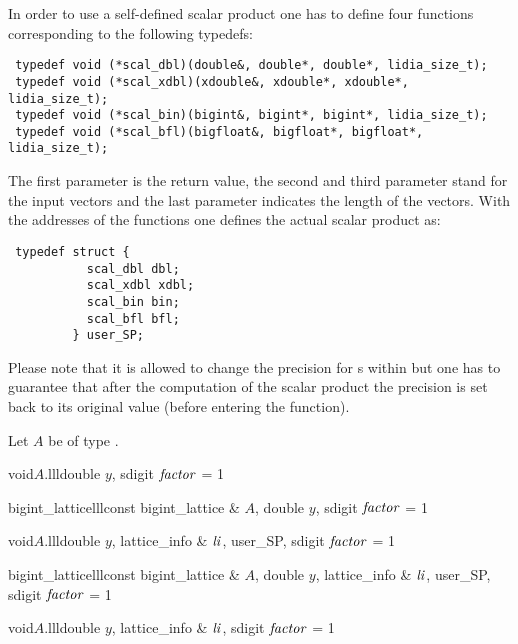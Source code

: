 In order to use a self-defined scalar product one has to define four functions corresponding to
the following typedefs:

\begin{verbatim}
 typedef void (*scal_dbl)(double&, double*, double*, lidia_size_t);
 typedef void (*scal_xdbl)(xdouble&, xdouble*, xdouble*, lidia_size_t);
 typedef void (*scal_bin)(bigint&, bigint*, bigint*, lidia_size_t);
 typedef void (*scal_bfl)(bigfloat&, bigfloat*, bigfloat*, lidia_size_t);
\end{verbatim}

The first parameter is the return value, the second and third parameter stand for the input
vectors and the last parameter indicates the length of the vectors.  With the addresses of the
functions one defines the actual scalar product as:
\begin{verbatim}
 typedef struct {
           scal_dbl dbl;
           scal_xdbl xdbl;
           scal_bin bin;
           scal_bfl bfl;
         } user_SP;
\end{verbatim}
Please note that it is allowed to change the precision for s within  but one has to guarantee that
after the computation of the scalar product the precision is set back to its original value
(before entering the function).

Let $A$ be of type .

\begin{fcode}{void}{$A$.lll}{double $y$, sdigit $\mathit{factor}$ = 1}
\end{fcode}

\begin{fcode}{bigint_lattice}{lll}{const bigint_lattice & $A$, double $y$, sdigit $\mathit{factor}$ = 1}
\end{fcode}

\begin{fcode}{void}{$A$.lll}{double $y$, lattice_info & $\mathit{li}$, user_SP, sdigit $\mathit{factor}$ = 1}
\end{fcode}

\begin{fcode}{bigint_lattice}{lll}{const bigint_lattice & $A$, double $y$, lattice_info & $\mathit{li}$,
    user_SP, sdigit $\mathit{factor}$ = 1}%
\end{fcode}

\begin{fcode}{void}{$A$.lll}{double $y$, lattice_info & $\mathit{li}$, sdigit $\mathit{factor}$ = 1}
\end{fcode}

